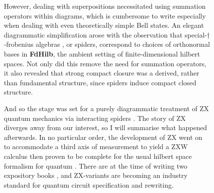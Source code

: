 \begin{figure}[h!]
\centering
{}
\caption{However, dealing with superpositions necessitated using summation operators within diagrams, which is cumbersome to write especially when dealing with even theoretically simple Bell states. An elegant diagrammatic simplification arose with the observation that special-$\dagger$-frobenius algebras \citep{coecke_classical_2009}, or spiders, correspond to choices of orthonormal bases \citep{coecke_new_2013} in \textbf{FdHilb}, the ambient setting of finite-dimensional hilbert spaces. Not only did this remove the need for summation operators, it also revealed that strong compact closure was a derived, rather than fundamental structure, since spiders induce compact closed structure.}
\end{figure}

\begin{figure}[h!]
\centering
{}
\caption{And so the stage was set for a purely diagrammatic treatment of ZX quantum mechanics via interacting spiders \citep{coecke_interacting_2011}. The story of ZX diverges away from our interest, so I will summarise what happened afterwards. In no particular order, the development of ZX went on to accommodate a third axis of measurement \citep{coecke_three_2011,de_witt_zx-calculus_2014} to yield a ZXW calculus then proven to be complete for the usual hilbert space formalism for quantum \citep{hadzihasanovic_algebra_2017,ng_completeness_2018,poor_completeness_2023}. There are at the time of writing two expository books \citep{coecke_picturing_2017,coecke_quantum_2023}, and ZX-variants are becoming an industry standard for quantum circuit specification and rewriting.}
\end{figure}
\clearpage

